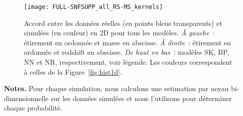 \documentclass[../main/main.tex]{subfiles}
\begin{document}
\begin{figure}[p]
    \vspace*{-2cm}
    \centerfloat
    \texttt{[image: FULL-SNFSUPP\_all\_RS-MS\_kernels]}
    \caption[Accord entre les données réelles et simulées en 2 dimensions pour
    tous les modèles]{Accord entre les données réelles (en points bleus
      transparents) et simulées (en couleur) en 2D pour tous les modèles.
      \textit{À gauche}~: étirement en ordonnée et masse en abscisse. \textit{À
    droite}~: étirement en ordonnée et redshift en abscisse. \textit{De haut en
  bas}~: modèles SK, BP, NN et NR, respectivement, voir légende. Les couleurs
correspondent à celles de la Figure~\ref{fig:hist1d}.}
    \label{fig:2dhex}
\end{figure}

\begin{table}[ht]
    \centering
     \caption[Comparaison de la capacité de chaque simulation à représenter
        les données en deux dimensions]{Comparaison de la capacité de chaque
            simulation à représenter les données d'étirement et de masse d'une
        part, et d'étirement et de redshift d'autre part.}
    \label{tab:chi2comp}
    \begin{threeparttable}
    \begin{tablenotes}[flushleft]
        \item \small \textbf{\hspace{-3,2pt}Notes.} Pour chaque simulation, nous
            calculons une estimation par noyau bi-dimensionnelle sur les données
            simulées et nous l'utilisons pour déterminer chaque probabilité.
    \end{tablenotes}
    \end{threeparttable}
\end{table}
\end{document}

